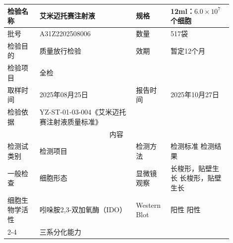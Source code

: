 \documentclass[UTF8,10pt,a4paper,fontset=fandol]{ctexart}
\newcommand{\fieldvalue}[1]{#1}
\begin{document}
\begin{tabular}{|p{0.13\linewidth}|p{0.39\linewidth}|p{0.13\linewidth}|p{0.25\linewidth}|}
\hline
检验名称 &
\fieldvalue{艾米迈托赛注射液} &
规格 &
\fieldvalue{12ml：$6.0\times10^{7}$个细胞}
\\ \hline
批号 &
\fieldvalue{A31Z2202508006} &
数量 &
\fieldvalue{517袋}
\\ \hline
检验目的 &
\fieldvalue{质量放行检验} &
效期 &
\fieldvalue{暂定12个月}
\\ \hline
检验项目 &
\fieldvalue{全检} &
\multicolumn{2}{l|}{}
\\ \hline
取样时间 &
\fieldvalue{2025年08月25日} &
报告时间 &
\fieldvalue{2025年10月27日}
\\ \hline
检验依据 &
\fieldvalue{YZ-ST-01-03-004《艾米迈托赛注射液质量标准》} &
\multicolumn{2}{l|}{}
\\ \hline
\multicolumn{4}{c|}{内容}
\\ \hline
检测试类别 & 检测项目 & 检测方法 & 检测标准 \quad 检测结果
\\ \hline
\fieldvalue{一般检查} &
\fieldvalue{细胞形态} &
\fieldvalue{显微镜观察} &
\fieldvalue{长梭形，贴壁生长}
\quad
\fieldvalue{长梭形，贴壁生长}
\\ \hline
\fieldvalue{细胞生物学活性} &
\fieldvalue{吲哚胺2,3-双加氧酶（IDO）} &
\fieldvalue{Western Blot} &
\fieldvalue{阳性}
\quad
\fieldvalue{阳性}
\\ \cline{2-4}
&
\fieldvalue{三系分化能力} &

\end{tabular}
\end{document}
